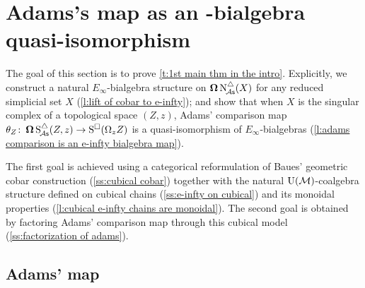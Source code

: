 
\section{Adams's map as an \pdfEinfty-bialgebra quasi-isomorphism} \label{s:theorem1}

The goal of this section is to prove \cref{t:1st main thm in the intro}.
Explicitly, we construct a natural $E_{\infty}$-bialgebra structure on $\operatorname{\mathbf{\Omega}} \operatorname{N^{\triangle}_{\!{\mathcal{A}\mathsf{s}}}}(X)$ for any reduced simplicial set $X$ (\cref{l:lift of cobar to e-infty}); and show that when $X$ is the singular complex of a topological space $(Z,z)$, Adams' comparison map $\theta_Z \colon \operatorname{\mathbf{\Omega}} \operatorname{S^{\triangle}_{\!{\mathcal{A}\mathsf{s}}}}(Z,z) \to \operatorname{S^{\square}}(\Omega_z Z)$ is a quasi-isomorphism of $E_\infty$-bialgebras (\cref{l:adams comparison is an e-infty bialgebra map}).

The first goal is achieved using a categorical reformulation of Baues' geometric cobar construction (\cref{ss:cubical cobar}) together with the natural ${\operatorname{U}(\mathcal{M})}$-coalgebra structure defined on cubical chains (\cref{ss:e-infty on cubical}) and its monoidal properties (\cref{l:cubical e-infty chains are monoidal}).
The second goal is obtained by factoring Adams' comparison map through this cubical model (\cref{ss:factorization of adams}).

\subsection{Adams' map} \label{ss:adams maps}

